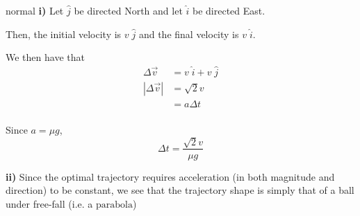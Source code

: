 \begin{solution}{normal}
\textbf{i)} Let $\hat{j}$ be directed North and let $\hat{i}$ be directed East.\vspace{3mm}

Then, the initial velocity is $v\;\hat{j}$ and the final velocity is $v\;\hat{i}$.\vspace{3mm}

We then have that
\begin{align*}
\Delta \vec{v}&=v\;\hat{i}+v\;\hat{j}\\
\left|\Delta\vec{v}\right|&=\sqrt{2}v\\
&=a\Delta t\\
\end{align*}

Since $a=\mu g$,
$$\Delta t=\boxed{\dfrac{\sqrt{2}v}{\mu g}}$$

\textbf{ii)} Since the optimal trajectory requires acceleration (in both magnitude and direction) to be constant, we see that the trajectory shape is simply that of a ball under free-fall (i.e. a $\boxed{\text{parabola}}$)
\end{solution}